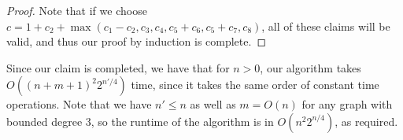 \documentclass[answers]{exam}
\begin{document}
\begin{questions}
\begin{solution}
\begin{proof}
    Note that if we choose $c = 1 + c_2 + \max(c_1 - c_2, c_3, c_4, c_5 + c_6, c_5 + c_7, c_8)$, all of these claims will be valid, and thus our proof by induction is complete.
\end{proof}

Since our claim is completed, we have that for $n > 0$, our algorithm takes $O((n + m + 1)^2 2^{n'/4})$ time, since it takes the same order of constant time operations.
Note that we have $n' \le n$ as well as $m = O(n)$ for any graph with bounded degree 3, so the runtime of the algorithm is in $O(n^2 2^{n / 4})$, as required.

\end{solution}

\end{questions}
\end{document}
